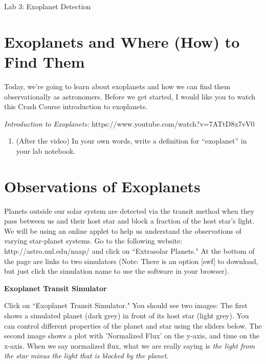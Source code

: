 \documentclass[11pt]{article}%
\begin{document}
\begin{center}
\huge Lab 3: Exoplanet Detection
\end{center}

\section{Exoplanets and Where (How) to Find Them}

\vspace{0.1in}

\noindent Today, we're going to learn about exoplanets and how we can find them observationally as astronomers. Before we get started, I would like you to watch this Crash Course introduction to exoplanets.  
\vspace{0.1in}

\emph{Introduction to Exoplanets:} https://www.youtube.com/watch?v=7ATtD8x7vV0

\vspace{0.1in}

\begin{enumerate}
\item  (After the video) In your own words, write a definition for ``exoplanet'' in your lab notebook. 
\end{enumerate}

\section{Observations of Exoplanets} 

\noindent Planets outside our solar system are detected via the transit method when they pass between us and their host star and block a fraction of the host star's light. We will be using an online applet to help us understand the observations of varying star-planet systems.  Go to the following website: http://astro.unl.edu/naap/ and click on ``Extrasolar Planets."  At the bottom of the page are links to two simulators (Note: There is an option [swf] to download, but just click the simulation name to use the software in your browser).

\vspace{0.1in}

\noindent \textbf{Exoplanet Transit Simulator}

\vspace{0.1in}

\noindent Click on ``Exoplanet Transit Simulator." You should see two images: The first shows a simulated planet (dark grey) in front of its host star (light grey). You can control different properties of the planet and star using the sliders below. The second image shows a plot with 'Normalized Flux' on the y-axis, and time on the x-axis. When we say normalized flux, what we are really saying is \emph{the light from the star minus the light that is blocked by the planet}. 
\end{document}
